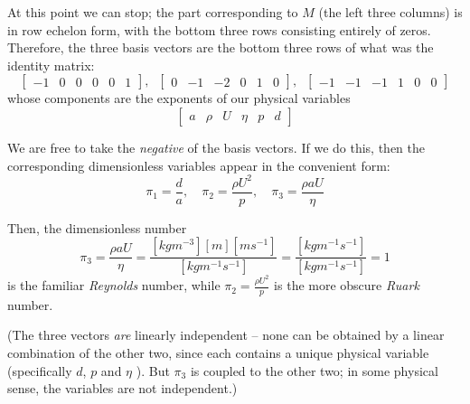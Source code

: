 \documentclass[a4paper]{report}
\begin{document}
At this point we can stop; the part corresponding to $M$ (the left three columns) is in row echelon form, with the bottom three rows consisting entirely of zeros.  Therefore, the three basis vectors are the bottom three rows of what was the identity matrix:
\begin{equation*}
\begin{bmatrix}
-1 & 0 & 0 & 0 & 0 & 1
\end{bmatrix}
,\;\;
\begin{bmatrix}
0 & -1 & -2 & 0 & 1 & 0
\end{bmatrix}
,\;\;
\begin{bmatrix}
-1 & -1 & -1 & 1 & 0 & 0
\end{bmatrix}
\end{equation*}
whose components are the exponents of our physical variables
\begin{equation*}
\begin{bmatrix}
a & \rho & U & \eta & p & d
\end{bmatrix}
\end{equation*}

We are free to take the \emph{negative} of the basis vectors.  If we do this, then the corresponding dimensionless variables appear in the convenient form:
\begin{equation}
 \pi_1 = \frac{d}{a}, \quad \pi_2 = \frac{\rho U^2}{p}, \quad
 \pi_3 = \frac{\rho a U}{\eta}
\end{equation}


Then, the dimensionless number
\begin{equation*}
\pi_3 = \frac{\rho a U}{\eta} = \frac{[kg m^{-3}] [m] [m s^{-1}]}{[kg m^{-1} s^{-1}]} = \frac{[kg m^{-1} s^{-1}]}{[kg m^{-1} s^{-1}]} = 1
\end{equation*}
is the familiar \emph{Reynolds} number, while $\pi_2 = \frac{\rho U^2}{p}$ is the more obscure \emph{Ruark} number.

\vspace{1em}
(The three vectors \emph{are} linearly independent -- none can be obtained by a linear combination of the other two, since each contains a unique physical variable (specifically $d$, $p$ and $\eta$ ).
But $\pi_3$ is coupled to the other two; in some physical sense, the variables are not independent.)

\vspace{2em}
\end{document}
